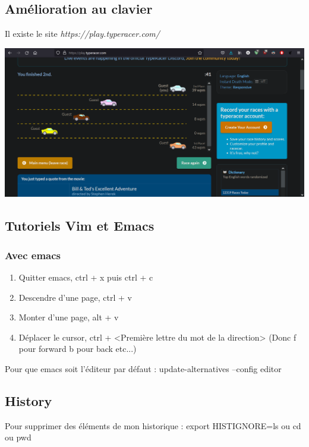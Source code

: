 \documentclass{article}
\begin{document}
\subsection{Amélioration au clavier}
Il existe le site \textit{https://play.typeracer.com/}

\begin{center}
\includegraphics[scale=0.5]{image/typing.PNG}
\end{center}

\newpage

\subsection{Tutoriels Vim et Emacs} %

\subsubsection*{Avec emacs}

\begin{enumerate}
\item Quitter emacs, ctrl + x puis ctrl + c
\item Descendre d'une page, ctrl + v
\item Monter d'une page, alt + v
\item Déplacer le cursor, ctrl + <Première lettre du mot de la direction> (Donc f pour forward b pour back etc...)
\end{enumerate}

Pour que emacs soit l'éditeur par défaut : update-alternatives --config editor

\subsection{History} %

Pour supprimer des éléments de mon historique : export HISTIGNORE=ls ou cd ou pwd
\end{document}
